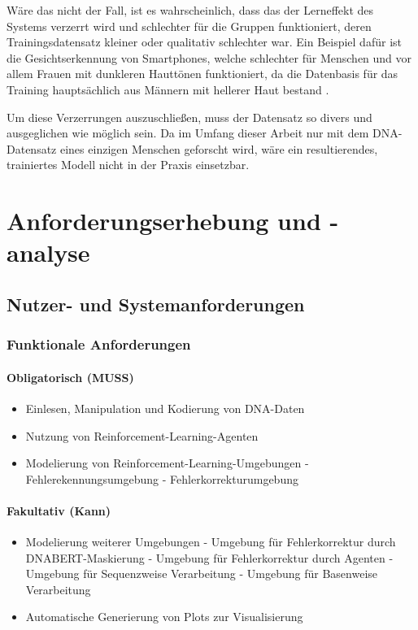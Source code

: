 \documentclass[oneside,bibliography=totocnumbered,BCOR=5mm]{scrbook}%
\theoremstyle{definition}
\theoremstyle{definition}
\theoremstyle{definition}
\theoremstyle{definition}
\theoremstyle{definition}
\theoremstyle{definition}
\begin{document}
Wäre das nicht der Fall, ist es wahrscheinlich, dass das der Lerneffekt des Systems verzerrt wird und
schlechter für die Gruppen funktioniert, deren Trainingsdatensatz kleiner oder qualitativ schlechter war.
Ein Beispiel dafür ist die Gesichtserkennung von Smartphones, welche schlechter für Menschen und 
vor allem Frauen mit dunkleren Hauttönen funktioniert, da die Datenbasis für das Training hauptsächlich
aus Männern mit hellerer Haut bestand \autocite{faceRecognition}.

Um diese Verzerrungen auszuschließen, muss der Datensatz so divers und ausgeglichen wie möglich sein.
Da im Umfang dieser Arbeit nur mit dem DNA-Datensatz eines einzigen Menschen geforscht wird, 
wäre ein resultierendes, trainiertes Modell nicht in der Praxis einsetzbar.

\clearpage

\chapter{Anforderungserhebung und -analyse}
\section{Nutzer- und Systemanforderungen}
\subsection{Funktionale Anforderungen}
\subsubsection{Obligatorisch (MUSS)}
\begin{itemize}
  \item Einlesen, Manipulation und Kodierung von DNA-Daten
  \item Nutzung von Reinforcement-Learning-Agenten
  \item Modelierung von Reinforcement-Learning-Umgebungen
    \subitem - Fehlerekennungsumgebung
    \subitem - Fehlerkorrekturumgebung
  \end{itemize}
\subsubsection{Fakultativ (Kann)}
\begin{itemize}
  \item Modelierung weiterer Umgebungen
    \subitem - Umgebung für Fehlerkorrektur durch DNABERT-Maskierung
    \subitem - Umgebung für Fehlerkorrektur durch Agenten
    \subitem - Umgebung für Sequenzweise Verarbeitung
    \subitem - Umgebung für Basenweise Verarbeitung
  \item Automatische Generierung von Plots zur Visualisierung
  \end{itemize}
\end{document}
